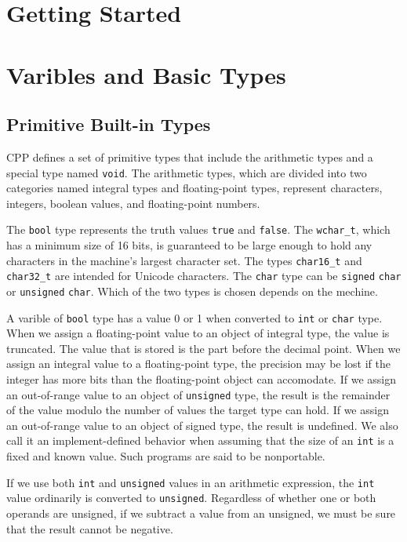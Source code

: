 \documentclass[11pt]{ctexart}
\title{}
\author{付国}
\date{2019K8009922008}
\begin{document}
\section{Getting Started}
\section{Varibles and Basic Types}
\subsection{Primitive Built-in Types}
CPP defines a set of primitive types that include the arithmetic types and a special type named \texttt{void}. The arithmetic types, which are divided into two categories named integral types and floating-point types, represent characters, integers, boolean values, and floating-point numbers.\par
The \texttt{bool} type represents the truth values \texttt{true} and \texttt{false}. The \verb|wchar_t|, which has a minimum size of 16 bits, is guaranteed to be large enough to hold any characters in the machine's largest character set. The types \verb|char16_t| and \verb|char32_t| are intended for Unicode characters. The \verb|char| type can be \verb|signed| \verb|char| or \verb|unsigned| \verb|char|. Which of the two types is  chosen depends on the mechine.\par
A varible of \verb|bool| type has a value 0 or 1 when converted to \verb|int| or \verb|char| type. When we assign a floating-point value to an object of integral type, the value is truncated. The value that is stored is the part before the decimal point. When we assign an integral value to a floating-point type, the precision may be lost if the integer has more bits than the floating-point object can accomodate. If we assign an out-of-range value to an object of \verb|unsigned| type, the result is the remainder of the value modulo the number of values the target type can hold. If we assign an out-of-range value to an object of signed type, the result is undefined. We also call it an implement-defined behavior when assuming that the size of an \verb|int| is a fixed and known value. Such programs are said to be nonportable.\par
If we use both \verb|int| and \verb|unsigned| values in an arithmetic expression, the \verb|int| value ordinarily is converted to \verb|unsigned|. Regardless of whether one or both operands are unsigned, if we subtract a value from an unsigned, we must be sure that the result cannot be negative.\par
\end{document}
